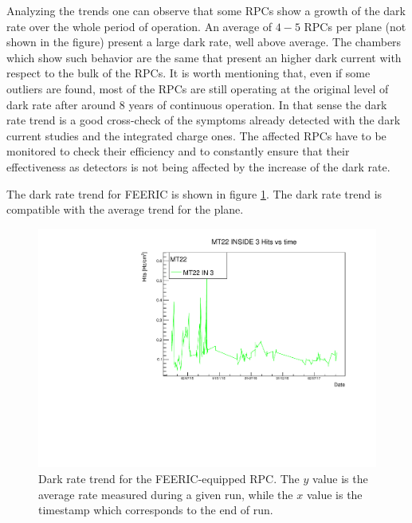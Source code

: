 Analyzing the trends one can observe that some RPCs show a growth of the dark rate over the whole period of operation.
An average of $4-5$ RPCs per plane (not shown in the figure) present a large dark rate, well above average.
The chambers which show such behavior are the same that present an higher dark current with respect to the bulk of the RPCs.
It is worth mentioning that, even if some outliers are found, most of the RPCs are still operating at the original level of dark rate after around 8 years of continuous operation.
In that sense the dark rate trend is a good cross-check of the symptoms already detected with the dark current studies and the integrated charge ones.
The affected RPCs have to be monitored to check their efficiency and to constantly ensure that their effectiveness as detectors is not being affected by the increase of the dark rate.

The dark rate trend for FEERIC is shown in figure \ref{fig:FEERICDarkRate}.
The dark rate trend is compatible with the average trend for the plane.

\begin{figure}[!t]
\begin{center}
\includegraphics[width=0.95\linewidth]{Chapters/Performance/Figs/DarkRateFEERIC.pdf}
\caption{Dark rate trend for the FEERIC-equipped RPC. The $y$ value is the average rate measured during a given run, while the $x$ value is the timestamp which corresponds to the end of run.}
\label{fig:FEERICDarkRate}
\end{center}
\end{figure}

